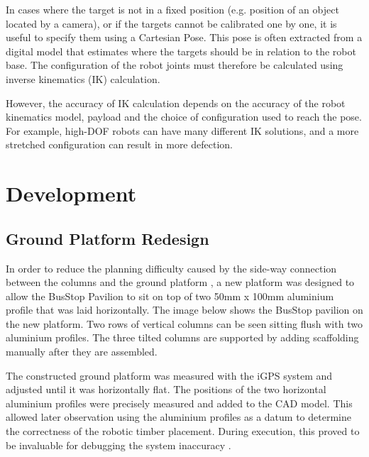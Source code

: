 In cases where the target is not in a fixed position (e.g. position of an object located by a camera), or if the targets cannot be calibrated one by one, it is useful to specify them using a Cartesian Pose. This pose is often extracted from a digital model that estimates where the targets should be in relation to the robot base. The configuration of the robot joints must therefore be calculated using inverse kinematics (IK) calculation. 

However, the accuracy of IK calculation depends on the accuracy of the robot kinematics model, payload and the choice of configuration used to reach the pose. For example, high-DOF robots can have many different IK solutions, and a more stretched configuration can result in more defection. 

\section{Development}
\label{section:exploration-3-development}

\subsection{Ground Platform Redesign}
\label{subsection:exploration-3-ground-platform-redesign}

In order to reduce the planning difficulty caused by the side-way connection between the columns and the ground platform , a new platform was designed to allow the BusStop Pavilion to sit on top of two 50mm x 100mm aluminium profile that was laid horizontally. The image below shows the BusStop pavilion on the new platform. Two rows of vertical columns can be seen sitting flush with two aluminium profiles. The three tilted columns are supported by adding scaffolding manually after they are assembled.



The constructed ground platform was measured with the iGPS system and adjusted until it was horizontally flat. The positions of the two horizontal aluminium profiles were precisely measured and added to the CAD model. This allowed later observation using the aluminium profiles as a datum to determine the correctness of the robotic timber placement. During execution, this proved to be invaluable for debugging the system inaccuracy .

